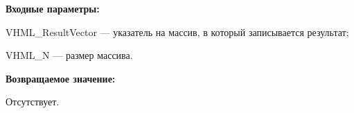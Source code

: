 \textbf{Входные параметры:}

 VHML\_ResultVector --- указатель на массив, в который записывается результат;
 
 VHML\_N --- размер массива.

\textbf{Возвращаемое значение:}

Отсутствует.